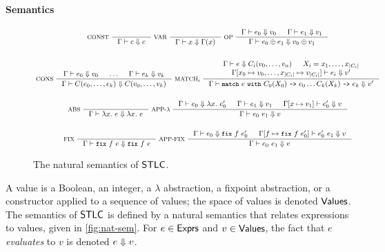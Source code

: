 \paragraph{Semantics}
%
\begin{figure*}
  \centering
  \begin{gather*}
  \inference[ CONST ]{ }{ \Gamma \judges c \evalsto c } 
  \inference[ VAR ]{ }{ \Gamma \judges x \evalsto \Gamma(x) }
  \inference[ OP ]{ %
    \Gamma \judges e_0 \evalsto v_0 & %
    \Gamma \judges e_1 \evalsto v_1 } %
  { \Gamma \judges e_0 \oplus e_1 \evalsto v_0 \oplus v_1 } \\ \\
  \inference[ CONS ]{ %
    \Gamma \judges e_0 \evalsto v_0 & \ldots & %
    \Gamma \judges e_k \evalsto v_k } %
  { \Gamma \judges C(e_0, \ldots, e_k) \evalsto C(v_0, \ldots, v_k) }
  \inference[ $\mathrm{MATCH}_{i}$ ]{ %
    \Gamma \judges e \evalsto C_i(v_0, \ldots, v_n) & %
    X_i = x_1, \ldots, x_{|C_i|} \\ %
    \Gamma[ x_0 \mapsto v_0, \ldots, x_{|C_i|} \mapsto v_{|C_i|} ]
    \judges %
    e_i \evalsto v' } %
  { \Gamma \judges \cc{match}\ e\ \cc{with}\ %
    C_0(X_0)\ \cc{->}\ e_0 %
    \ldots %
    C_k(X_k)\ \cc{->}\ e_k \evalsto v' } \\ \\
  \inference[ ABS ]{ } %
  { \Gamma \judges \lambda x.\ e \evalsto \lambda x.\ e }
  \inference[ APP-$\lambda$ ]{ %
    \Gamma \judges e_0 \evalsto \lambda x.\ e_0' & %
    \Gamma \judges e_1 \evalsto v_1 & %
    \upd{\Gamma}{x}{v_1} \judges e_0' \evalsto v }
  { \Gamma \judges e_0\ e_1 \evalsto v } \\ \\
  \inference[ FIX ]{ } %
  { \Gamma \judges \fix{ f }{ e } \evalsto \fix{ f }{ e } } 
  \inference[ APP-FIX ]{ %
    \Gamma \judges e_0 \evalsto \fix{ f }{ e_0' } & %
    \upd{ \Gamma }{ f }{ \fix{ f }{ e_0' } } \judges %
    e_0'\ e_1 \evalsto v }
  { \Gamma \judges e_0\ e_1 \evalsto v } 
  \end{gather*}
  \caption{The natural semantics of $\mathsf{STLC}$.}
  \label{fig:nat-sem}
\end{figure*}
%
A value is a Boolean, an integer, a $\lambda$ abstraction, a fixpoint
abstraction, or a constructor applied to a sequence of values;
%
the space of values is denoted $\mathsf{Values}$.
%
The semantics of $\mathsf{STLC}$ is defined by a natural semantics that
relates expressions to values, given in \autoref{fig:nat-sem}.
%
For $e \in \mathsf{Exprs}$ and $v \in \mathsf{Values}$, the fact that $e$
\emph{evaluates} to $v$ is denoted $e \Downarrow v$.

